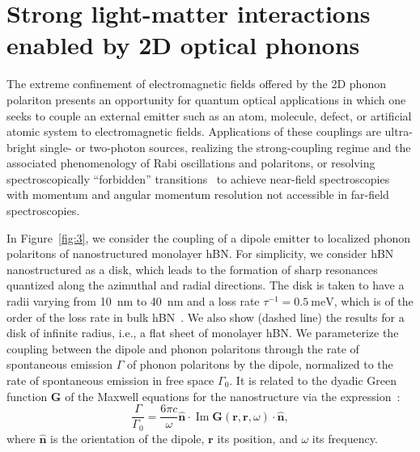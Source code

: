\documentclass[aps,prb,twocolumn,
	           groupedaddress,superscriptaddress,
               amsfonts,amssymb,amsmath,floatfix,
	           citeautoscript]{revtex4-1}
\renewcommand{\Im}{\operatorname{Im}}
\begin{document}
\section{Strong light-matter interactions enabled by 2D optical phonons}

The extreme confinement of electromagnetic fields offered by the 2D phonon polariton presents an opportunity for quantum optical applications in which one seeks to couple an external emitter such as an atom, molecule, defect, or artificial atomic system to electromagnetic fields. Applications of these couplings are ultra-bright single- or two-photon sources, realizing the strong-coupling regime and the associated phenomenology of Rabi oscillations and polaritons, or resolving spectroscopically ``forbidden'' transitions~\cite{koppens2011graphene,autore2018boron,rivera2016shrinking,rivera2017making,kurman2018control} to achieve near-field spectroscopies with momentum and angular momentum resolution not accessible in far-field spectroscopies.

In Figure~\ref{fig:3}, we consider the coupling of a dipole emitter to localized phonon polaritons of nanostructured monolayer hBN. For simplicity, we consider hBN nanostructured as a disk, which leads to the formation of sharp resonances quantized along the azimuthal and radial directions. The disk is taken to have a radii varying from \SI{10}{\nm} to \SI{40}{nm}
and a loss rate $\tau^{-1} = \SI{0.5}{\meV}$, which is of the order of the loss rate in bulk hBN~\cite{caldwell2014sub, dai2014tunable}. We also show (dashed line) the results for a disk of infinite radius, i.e., a flat sheet of monolayer hBN. We parameterize the coupling between the dipole and phonon polaritons through the rate of spontaneous emission $\Gamma$ of phonon polaritons by the dipole, normalized to the rate of spontaneous emission in free space $\Gamma_0$. It is related to the dyadic Green function $\mathbf{G}$ of the Maxwell equations for the nanostructure via the expression~\cite{novotny2012principles}:
\begin{equation}
	\frac{\Gamma}{\Gamma_0} 
	=  \frac{6\pi c}{\omega}\hat{\mathbf{n}}\cdot\Im\mathbf{G}(\mathbf{r},\mathbf{r},\omega)\cdot\hat{\mathbf{n}},
\end{equation}
where $\hat{\mathbf{n}}$ is the orientation of the dipole, $\mathbf{r}$ its position, and $\omega$ its frequency.
\end{document}
